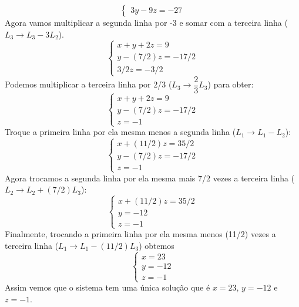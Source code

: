 \begin{exemplos}
\begin{solucao}
\begin{enumerate}[label={\arabic*})]
\[\begin{cases}
                                3y - 9z = -27
                            \end{cases}
                        \]
                        Agora vamos multiplicar a segunda linha por -3 e somar com a terceira linha ($L_3 \to L_3 - 3L_2$).
                        \[
                            \begin{cases}
                                x + y + 2z = 9\\
                                y - (7/2)z = -17/2\\
                                3/2z = -3/2
                            \end{cases}
                        \]
                        Podemos multiplicar a terceira linha por 2/3 ($L_3 \to \dfrac{2}{3}L_3$) para obter:
                        \[
                            \begin{cases}
                                x + y + 2z = 9\\
                                y - (7/2)z = -17/2\\
                                z = -1
                            \end{cases}
                        \]
                        Troque a primeira linha por ela mesma menos a segunda linha ($L_1 \to L_1 - L_2$):
                        \[
                            \begin{cases}
                                x + (11/2)z = 35/2\\
                                y - (7/2)z = -17/2\\
                                z = -1
                            \end{cases}
                        \]
                        Agora trocamos a segunda linha por ela mesma mais 7/2 vezes a terceira linha ($L_2 \to L_2 + (7/2)L_3$):
                        \[
                            \begin{cases}
                                x + (11/2)z = 35/2\\
                                y  = -12\\
                                z = -1
                            \end{cases}
                        \]
                        Finalmente, trocando a primeira linha por ela mesma menos (11/2) vezes a terceira linha ($L_1 \to L_1 - (11/2)L_3$) obtemos
                        \[
                            \begin{cases}
                                x = 23\\
                                y = -12\\
                                z = -1
                            \end{cases}
                        \]
                        Assim vemos que o sistema tem uma única solução que é $x = 23$, $y = -12$ e $z = -1$.
		\end{enumerate}
	\end{solucao}
\end{exemplos}

